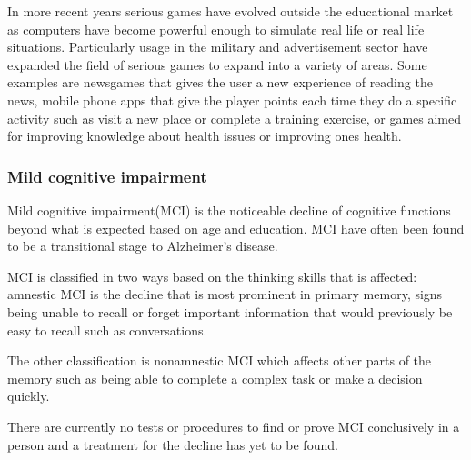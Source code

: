 In more recent years serious games have evolved outside the educational market as computers have become powerful enough to simulate real life or real life situations.
Particularly usage in the military and advertisement sector have expanded the field of serious games to expand into a variety of areas.
Some examples are newsgames that gives the user a new experience of reading the news, mobile phone apps that give the player points each time they do a specific activity
such as visit a new place or complete a training exercise, or games aimed for improving knowledge about health issues or improving ones health.

\subsubsection{Mild cognitive impairment}

Mild cognitive impairment(MCI) is the noticeable decline of cognitive functions beyond what is expected based on age and education.
MCI have often been found to be a transitional stage to Alzheimer's disease. \cite{MCI_alzOrg}

MCI is classified in two ways based on the thinking skills that is affected:
amnestic MCI is the decline that is most prominent in primary memory, signs being unable to recall or forget important information that
would previously be easy to recall such as conversations.

The other classification is nonamnestic MCI which affects other parts of the memory such as being able to complete
a complex task or make a decision quickly.

There are currently no tests or procedures to find or prove MCI conclusively in a person and a treatment for the decline has yet to be found.
